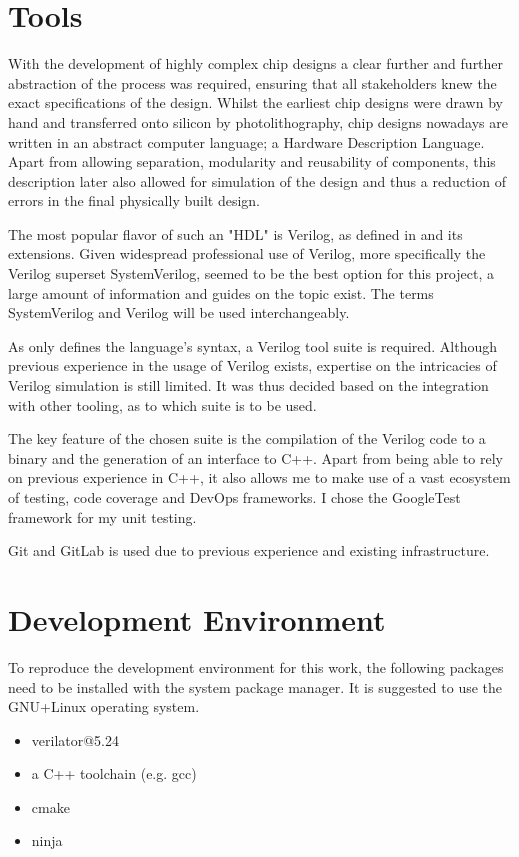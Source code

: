 \section{Tools}
With the development of highly complex chip designs a clear further and further abstraction of the process was required, ensuring that all stakeholders knew the exact specifications of the design. \cite{1214355} Whilst the earliest chip designs were drawn by hand and transferred onto silicon by photolithography, chip designs nowadays are written in an abstract computer language; a Hardware Description Language. Apart from allowing separation, modularity and reusability of components, this description later also allowed for simulation of the design and thus a reduction of errors in the final physically built design. 

The most popular flavor of such an "HDL" is Verilog, as defined in \cite{10458102} and its extensions. Given widespread professional use of Verilog, more specifically the Verilog superset SystemVerilog, seemed to be the best option for this project, a large amount of information and guides on the topic exist. The terms SystemVerilog and Verilog will be used interchangeably. 

As \cite{10458102} only defines the language's syntax, a Verilog tool suite is required. Although previous experience in the usage of Verilog exists, expertise on the intricacies of Verilog simulation is still limited. It was thus decided based on the integration with other tooling, as to which suite is to be used. 

The key feature of the chosen suite is the compilation of the Verilog code to a binary and the generation of an interface to C++. Apart from being able to rely on previous experience in C++, it also allows me to make use of a vast ecosystem of testing, code coverage and DevOps frameworks. I chose the GoogleTest framework for my unit testing. 

Git and GitLab is used due to previous experience and existing infrastructure.
  
\section{Development Environment}
To reproduce the development environment for this work, the following packages need to be installed with the system package manager. It is suggested to use the GNU+Linux operating system. 

\begin{itemize}
  \item verilator@5.24
  \item a C++ toolchain (e.g. gcc)
  \item cmake
  \item ninja
\end{itemize}
  

